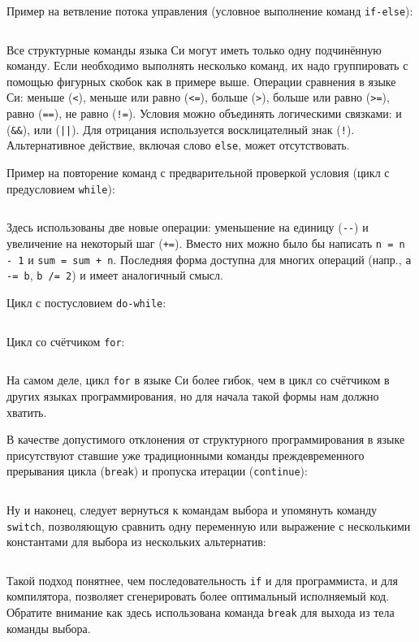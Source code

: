 \zzneedspace
Пример на ветвление потока управления (условное выполнение команд \texttt{if-else}):
%
\inputminted{c}{samples/01_if.c}

Все структурные команды языка Си могут иметь только одну подчинённую команду.
Если необходимо выполнять несколько команд, их надо группировать с помощью
фигурных скобок как в примере выше. Операции сравнения в языке Си: меньше
(\verb|<|), меньше или равно (\verb|<=|), больше (\verb|>|), больше или равно
(\verb|>=|), равно (\verb|==|), не равно (\verb|!=|). Условия можно объединять
логическими связками: и (\verb|&&|), или (\verb/||/). Для отрицания
используется восклицателный знак (\verb|!|). Альтернативное действие,
включая слово \texttt{else}, может отсутствовать.

\zzneedspace
Пример на повторение команд с предварительной проверкой условия (цикл с
предусловием \texttt{while}):
%
\inputminted{c}{samples/02_while.c}

Здесь использованы две новые операции: уменьшение на единицу (\verb|--|) и
увеличение на некоторый шаг (\verb|+=|). Вместо них можно было бы написать
\verb|n = n - 1| и \verb|sum = sum + n|. Последняя форма доступна для многих
операций (напр., \verb|a -= b|, \verb|b /= 2|) и имеет аналогичный смысл.

\zzneedspace
Цикл с постусловием \texttt{do-while}:
%
\inputminted{c}{samples/03_do_while.c}

\zzneedspace
Цикл со счётчиком \texttt{for}:
%
\inputminted{c}{samples/04_for.c}

На самом деле, цикл \texttt{for} в языке Си более гибок, чем в цикл со
счётчиком в других языках программирования, но для начала такой формы
нам должно хватить.

В качестве допустимого отклонения от структурного программирования в языке
присутствуют ставшие уже традиционными команды преждевременного прерывания
цикла (\texttt{break}) и пропуска итерации (\texttt{continue}):
\zzneedspace
\inputminted{c}{samples/05_break.c}

\zzneedspace
Ну и наконец, следует вернуться к командам выбора и упомянуть команду
\verb|switch|, позволяющую сравнить одну переменную или выражение
с несколькими константами для выбора из нескольких альтернатив:
%
\inputminted{c}{samples/06_switch.c}

Такой подход понятнее, чем последовательность \texttt{if} и для программиста,
и для компилятора, позволяет сгенерировать более оптимальный исполняемый код.
Обратите внимание как здесь использована команда \texttt{break} для выхода из
тела команды выбора.



